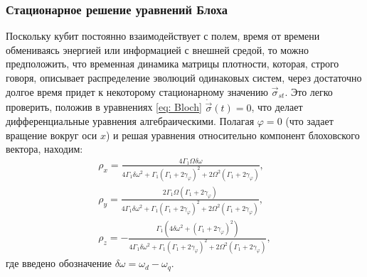 \subsubsection{Стационарное решение уравнений Блоха}
Поскольку кубит постоянно взаимодействует с полем, время от времени обмениваясь энергией или информацией с внешней средой, то можно предположить, что временная динамика матрицы плотности, которая, строго говоря, описывает распределение эволюций одинаковых систем, через достаточно долгое время придет к некоторому стационарному значению $\vec{\sigma}_{st}$. Это легко проверить, положив в уравнениях \eqref{eq: Bloch}  $\dot{\vec{\sigma}}(t)=0$, что делает дифференциальные уравнения алгебраическими. Полагая $\varphi=0$ (что задает вращение вокруг оси $x$) и решая уравнения относительно компонент блоховского вектора, находим:
\begin{multline}
\rho_{x} = \frac{4 \Gamma_{1} \Omega \delta\omega}{4 \Gamma_{1} \delta\omega^{2} + \Gamma_{1} \left(\Gamma_{1} + 2 \gamma_{\varphi}\right)^{2} + 2 \Omega^{2} \left(\Gamma_{1} + 2 \gamma_{\varphi}\right)},\\\rho_{y} = \frac{2 \Gamma_{1} \Omega \left(\Gamma_{1} + 2 \gamma_{\varphi}\right)}{4 \Gamma_{1} \delta\omega^{2} + \Gamma_{1} \left(\Gamma_{1} + 2 \gamma_{\varphi}\right)^{2} + 2 \Omega^{2} \left(\Gamma_{1} + 2 \gamma_{\varphi}\right)},\\ \rho_{z} = - \frac{\Gamma_{1} \left(4 \delta\omega^{2} + \left(\Gamma_{1} + 2 \gamma_{\varphi}\right)^{2}\right)}{4 \Gamma_{1} \delta\omega^{2} + \Gamma_{1} \left(\Gamma_{1} + 2 \gamma_{\varphi}\right)^{2} + 2 \Omega^{2} \left(\Gamma_{1} + 2 \gamma_{\varphi}\right)},
\label{eq: stat_sol}
\end{multline}
где введено обозначение $\delta\omega=\omega_d-\omega_q$.
